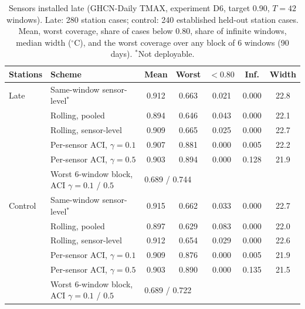 \begin{table}[htbp]
\caption{Sensors installed late (GHCN-Daily TMAX, experiment D6, target 0.90, $T=42$ windows). Late: 280 station cases; control: 240 established held-out station cases. Mean, worst coverage, share of cases below 0.80, share of infinite windows, median width ($^\circ$C), and the worst coverage over any block of 6 windows (90 days). $^*$Not deployable.}
\label{tab:d6full}
\centering\scriptsize
\setlength{\tabcolsep}{3pt}
\begin{tabular}{llccccc}
\toprule
\textbf{Stations} & \textbf{Scheme} & \textbf{Mean} & \textbf{Worst} & \textbf{$<0.80$} & \textbf{Inf.} & \textbf{Width} \\
\midrule
Late & Same-window sensor-level$^*$ & 0.912 & 0.663 & 0.021 & 0.000 & 22.8 \\
 & Rolling, pooled & 0.894 & 0.646 & 0.043 & 0.000 & 22.1 \\
 & Rolling, sensor-level & 0.909 & 0.665 & 0.025 & 0.000 & 22.7 \\
 & Per-sensor ACI, $\gamma=0.1$ & 0.907 & 0.881 & 0.000 & 0.005 & 22.2 \\
 & Per-sensor ACI, $\gamma=0.5$ & 0.903 & 0.894 & 0.000 & 0.128 & 21.9 \\
 & Worst 6-window block, ACI $\gamma=0.1$ / $0.5$ & \multicolumn{5}{l}{0.689 / 0.744} \\
\midrule
Control & Same-window sensor-level$^*$ & 0.915 & 0.662 & 0.033 & 0.000 & 22.7 \\
 & Rolling, pooled & 0.897 & 0.629 & 0.083 & 0.000 & 22.0 \\
 & Rolling, sensor-level & 0.912 & 0.654 & 0.029 & 0.000 & 22.6 \\
 & Per-sensor ACI, $\gamma=0.1$ & 0.909 & 0.876 & 0.000 & 0.005 & 21.9 \\
 & Per-sensor ACI, $\gamma=0.5$ & 0.903 & 0.890 & 0.000 & 0.135 & 21.5 \\
 & Worst 6-window block, ACI $\gamma=0.1$ / $0.5$ & \multicolumn{5}{l}{0.689 / 0.722} \\
\bottomrule
\end{tabular}
\end{table}
